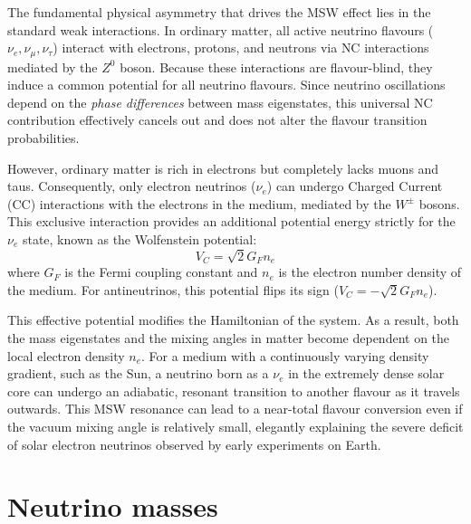 The fundamental physical asymmetry that drives the \ac{MSW} effect lies in the standard weak interactions. In ordinary matter, all active neutrino flavours ($\nu_e, \nu_\mu, \nu_\tau$) interact with electrons, protons, and neutrons via \ac{NC} interactions mediated by the $Z^0$ boson. Because these interactions are flavour-blind, they induce a common potential for all neutrino flavours. Since neutrino oscillations depend on the \textit{phase differences} between mass eigenstates, this universal \ac{NC} contribution effectively cancels out and does not alter the flavour transition probabilities.

However, ordinary matter is rich in electrons but completely lacks muons and taus. Consequently, only electron neutrinos ($\nu_e$) can undergo Charged Current (\ac{CC}) interactions with the electrons in the medium, mediated by the $W^\pm$ bosons. This exclusive interaction provides an additional potential energy strictly for the $\nu_e$ state, known as the Wolfenstein potential:
\begin{equation}
    V_C = \sqrt{2} G_F n_e
\end{equation}
where $G_F$ is the Fermi coupling constant and $n_e$ is the electron number density of the medium. For antineutrinos, this potential flips its sign ($V_C = -\sqrt{2} G_F n_e$).

This effective potential modifies the Hamiltonian of the system. As a result, both the mass eigenstates and the mixing angles in matter become dependent on the local electron density $n_e$. For a medium with a continuously varying density gradient, such as the Sun, a neutrino born as a $\nu_e$ in the extremely dense solar core can undergo an adiabatic, resonant transition to another flavour as it travels outwards. This MSW resonance can lead to a near-total flavour conversion even if the vacuum mixing angle is relatively small, elegantly explaining the severe deficit of solar electron neutrinos observed by early experiments on Earth.


\section[Neutrino masses]{Neutrino masses\footnotemark}
